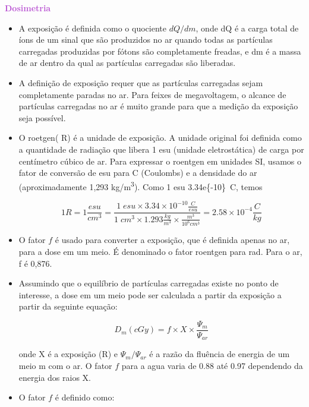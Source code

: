 \documentclass[11pt,a4paper]{article}
\newcounter{exemplo}
\begin{document}
\begin{exemplo}

    \textcolor{MediumOrchid}{\LobsterTwo\textbf{Dosimetria}}
    \begin{itemize}
        \item A exposição é definida como o quociente $dQ/dm$, onde dQ é a carga total de íons de um sinal que são produzidos no ar quando todas as partículas carregadas produzidas por fótons são completamente freadas, e dm é a massa de ar dentro da qual as partículas carregadas são liberadas. 
        
        \item A definição de exposição requer que as partículas carregadas sejam completamente paradas no ar. Para feixes de megavoltagem, o alcance de partículas carregadas no ar é muito grande para que a medição da exposição seja possível.
        
        \item O roetgen( R) é a unidade de exposição. A unidade original foi definida como a quantidade de radiação que libera 1 esu (unidade eletrostática) de carga por centímetro cúbico de ar. Para expressar o roentgen em unidades SI, usamos o fator de conversão de esu para C (Coulombs) e a densidade do ar (aproximadamente 1,293 \unit{kg/m^3}). Como 1 esu  \qty{3.34e{-10}}{C}, temos
        
        $$1R = 1 \frac{esu}{cm^3} = \frac{1\;esu \times 3.34 \times 10^{-10} \frac{C}{esu}}{1\;cm^3 \times 1.293 \frac{kg}{m^3} \times \frac{m^3}{10^6 cm^3}} = 2.58 \times 10^{-4} \frac{C}{kg}$$

        \item O fator $f$ é usado para converter a exposição, que é definida apenas no ar, para a dose em um meio. É denominado o fator roentgen para rad. Para o ar, f é 0,876.
        
        \item Assumindo que o equilíbrio de partículas carregadas existe no ponto de interesse, a dose em um meio pode ser calculada a partir da exposição a partir da seguinte equação:
        
            $$D_m(cGy) = f \times X \times \frac{\Psi_m}{\Psi_{ar}}$$

        onde X é a exposição (R) e $\Psi_{m}/\Psi_{ar}$ é a razão da fluência de energia de um meio m com o ar. O fator $f$ para a agua varia de 0.88 até 0.97 dependendo da energia dos raios X.


        \item O fator $f$ é definido como:
        

\end{itemize}
\end{exemplo}
\end{document}
